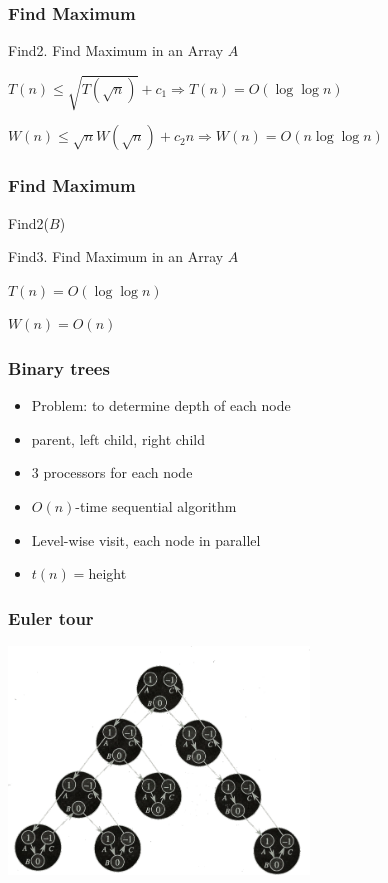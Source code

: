 \documentclass[14pt,aspectratio=169]{beamer}
\begin{document}
\begin{frame}\frametitle{Find Maximum}
\begin{algorithm}[H]
\caption{Find2.    
Find Maximum in an Array $A$}
\end{algorithm}
$T(n)\le \sqrt{T(\sqrt{n})} + c_{1} \Rightarrow T(n) = O(\log \log n)$

$W(n)\le \sqrt{n} W(\sqrt{n}) + c_{2}n \Rightarrow W(n) = O(n \log \log n)$
\end{frame}


\begin{frame}\frametitle{Find Maximum}
\begin{algorithm}[H]
Find2($B$)\;
\caption{Find3.    
Find Maximum in an Array $A$}
\end{algorithm}
$T(n) = O(\log \log n)$

$W(n) = O(n)$
\end{frame}


\begin{frame}\frametitle{Binary trees}
  \begin{itemize}
  \item
    Problem: to determine depth of each node
  \item
    parent, left child, right child
  \item
    $3$ processors for each node
  \item
    $O(n)$-time sequential algorithm
  \item
    Level-wise visit, each node in parallel
  \item
    $t(n)=$height
  \end{itemize}
\end{frame}


\begin{frame}\frametitle{Euler tour}
  \begin{center}
    \includegraphics[width=8cm]{euler1.png}
  \end{center}

\end{frame}
\end{document}
